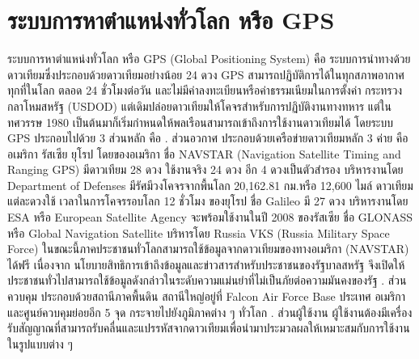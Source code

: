 \section{ระบบการหาตำแหน่งทั่วโลก หรือ GPS}
\quad ระบบการหาตำแหน่งทั่วโลก หรือ GPS (Global Positioning System) คือ ระบบการนำทางด้วยดาวเทียมซึ่งประกอบด้วยดาวเทียมอย่างน้อย 24 ดวง GPS สามารถปฏิบัติการได้ในทุกสภาพอากาศ ทุกที่ในโลก ตลอด 24 ชั่วโมงต่อวัน และไม่มีค่าลงทะเบียนหรือค่าธรรมเนียมในการตั้งค่า กระทรวงกลาโหมสหรัฐ (USDOD) แต่เดิมปล่อยดาวเทียมให้โคจรสำหรับการปฏิบัติงานทางทหาร แต่ในทศวรรษ 1980 เป็นต้นมาก็เริ่มกำหนดให้พลเรือนสามารถเข้าถึงการใช้งานดาวเทียมได้ โดยระบบ GPS ประกอบไปด้วย 3 ส่วนหลัก คือ  
. ส่วนอวกาศ ประกอบด้วยเครือข่ายดาวเทียมหลัก 3 ค่าย คือ อเมริกา รัสเซีย ยุโรป โดยของอเมริกา ชื่อ NAVSTAR (Navigation Satellite Timing and Ranging GPS) มีดาวเทียม 28 ดวง ใช้งานจริง 24 ดวง อีก 4 ดวงเป็นตัวสำรอง บริหารงานโดย Department of Defenses มีรัศมีวงโคจรจากพื้นโลก 20,162.81 กม.หรือ 12,600 ไมล์ ดาวเทียมแต่ละดวงใช้ เวลาในการโคจรรอบโลก 12 ชั่วโมง ของยุโรป ชื่อ Galileo มี 27 ดวง บริหารงานโดย ESA หรือ European Satellite Agency จะพร้อมใช้งานในปี 2008 ของรัสเซีย ชื่อ GLONASS หรือ Global Navigation Satellite บริหารโดย Russia VKS (Russia Military Space Force) ในขณะนี้ภาคประชาชนทั่วโลกสามารถใช้ข้อมูลจากดาวเทียมของทางอเมริกา (NAVSTAR) ได้ฟรี เนื่องจาก นโยบายสิทธิการเข้าถึงข้อมูลและข่าวสารสำหรับประชาชนของรัฐบาลสหรัฐ จึงเปิดให้ประชาชนทั่วไปสามารถใช้ข้อมูลดังกล่าวในระดับความแม่นยำที่ไม่เป็นภัยต่อความมันคงของรัฐ  
. ส่วนควบคุม ประกอบด้วยสถานีภาคพื้นดิน สถานีใหญ่อยู่ที่ Falcon Air Force Base ประเทศ อเมริกา และศูนย์ควบคุมย่อยอีก 5 จุด กระจายไปยังภูมิภาคต่าง ๆ ทั่วโลก 
. ส่วนผู้ใช้งาน ผู้ใช้งานต้องมีเครื่องรับสัญญาณที่สามารถรับคลื่นและแปรรหัสจากดาวเทียมเพื่อนำมาประมวลผลให้เหมาะสมกับการใช้งานในรูปแบบต่าง ๆ 

